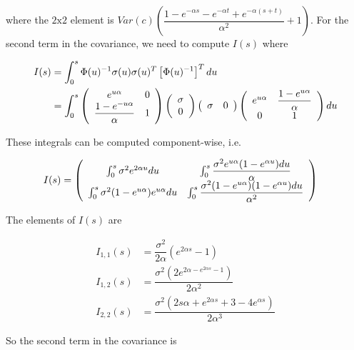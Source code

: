\documentclass{article}
\numberwithin{questioncounter}{section}
\begin{document}
\begin{solution}
where the $2 \text{x} 2$ element is $Var(c) \left(\dfrac{1 - e^{-\alpha s} - e^{-\alpha t} + e^{-\alpha (s+t)}}{\alpha^2} + 1\right)$. For the second term in the covariance, we need to compute $I(s)$ where

\begin{align*}
I(s) &= \int_{0}^{s} \Phi(u)^{-1} \sigma(u) \sigma(u)^{T} \left[\Phi(u)^{-1}\right]^{T} du \\
&= \int_{0}^{s} \left(\begin{array}{c c} e^{u \alpha} & 0 \\ \dfrac{1 - e^{-u \alpha}}{\alpha} & 1 \end{array} \right) \left(\begin{array}{c} \sigma \\ 0 \end{array}\right) \left(\begin{array}{c c} \sigma & 0 \end{array} \right) \left(\begin{array}{c c} e^{u \alpha} & \dfrac{1 - e^{u\alpha}}{\alpha} \\ 0 & 1 \end{array} \right) du
\end{align*}

These integrals can be computed component-wise, i.e.

\begin{align*}
I(s) &= \left(\begin{array}{c c} \int_{0}^{s} \sigma^{2} e^{2\alpha u} du & \int_{0}^{s} \dfrac{\sigma^2 e^{u\alpha} (1 - e^{\alpha u}) du}{\alpha} \\
\int_{0}^{s} \sigma^{2} (1 - e^{u \alpha}) e^{u \alpha} du & \int_{0}^{s} \dfrac{\sigma^{2} (1 - e^{u \alpha})(1 - e^{\alpha u})du}{\alpha^2} \end{array}\right)
\end{align*}

The elements of $I(s)$ are

\begin{align*}
I_{1,1}(s) &= \dfrac{\sigma^2}{2\alpha} (e^{2\alpha s} - 1) \\
I_{1,2}(s) &= \dfrac{\sigma^{2} (2 e^{2\alpha - e^{2\alpha s} - 1})}{2\alpha^2} \\
I_{2,2}(s) &= \dfrac{\sigma^2(2s\alpha + e^{2\alpha s} + 3 - 4e^{\alpha s})}{2\alpha^3}
\end{align*}

So the second term in the covariance is


\end{solution}
\end{document}
